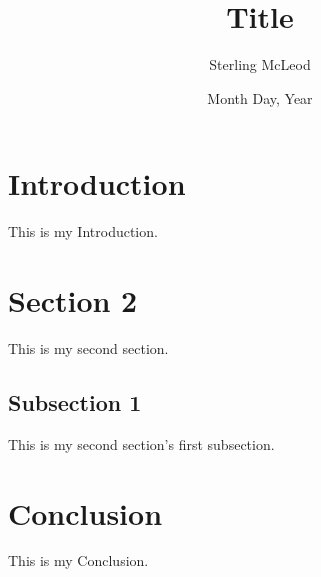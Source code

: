 \documentclass[conference]{ieeeconf}
\begin{document}
\author{Sterling McLeod}
\title {Title}
\date {Month Day, Year}

\maketitle


\section {Introduction}
    This is my Introduction.

\section {Section 2}
    This is my second section.

\subsection {Subsection 1}
    This is my second section's first subsection.

\section {Conclusion}
    This is my Conclusion.




\end{document}
